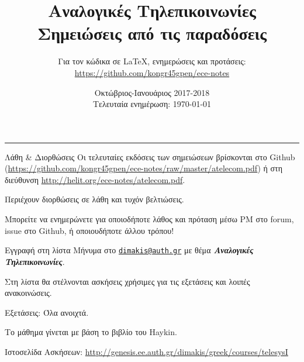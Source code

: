 \documentclass[11pt,a4paper,notitlepage,fleqn,final]{article}
\title{Αναλογικές Τηλεπικοινωνίες
	\\
	{ 
		\normalsize Σημειώσεις από τις παραδόσεις
	}}
\date{Οκτώβριος-Ιανουάριος 2017-2018
	\\
	{ 
		\small Τελευταία ενημέρωση: \today
	}
}
\author{
	Για τον κώδικα σε \LaTeX, ενημερώσεις και προτάσεις:
	\\
	\url{https://github.com/kongr45gpen/ece-notes}}
\begin{document}
\maketitle

\hrule
\vspace{50pt}

\begin{infobox}{Λάθη \& Διορθώσεις}
	Οι τελευταίες εκδόσεις των σημειώσεων βρίσκονται στο Github
	(\url{https://github.com/kongr45gpen/ece-notes/raw/master/atelecom.pdf}) ή
	στη διεύθυνση \url{http://helit.org/ece-notes/atelecom.pdf}.
	
	Περιέχουν διορθώσεις σε λάθη και τυχόν βελτιώσεις.
	
	\tcblower
	
	Μπορείτε να ενημερώνετε για οποιοδήποτε λάθος και πρόταση
	μέσω PM στο forum, issue στο Github, ή οποιουδήποτε άλλου τρόπου!
\end{infobox}

\begin{attnbox}{Εγγραφή στη λίστα}
	Μήνυμα στο \href{mailto:dimakis@auth.gr}{\texttt{dimakis@auth.gr}} με θέμα
	\textit{\textbf{Αναλογικές Τηλεπικοινωνίες}}.
	
	\tcblower
	
	Στη λίστα θα στέλνονται ασκήσεις χρήσιμες για τις εξετάσεις και λοιπές ανακοινώσεις.
\end{attnbox}

Εξετάσεις: Όλα ανοιχτά.

Το μάθημα γίνεται με βάση το βιβλίο του Haykin.

Ιστοσελίδα Ασκήσεων:
\url{http://genesis.ee.auth.gr/dimakis/greek/courses/telesysI}
\end{document}
